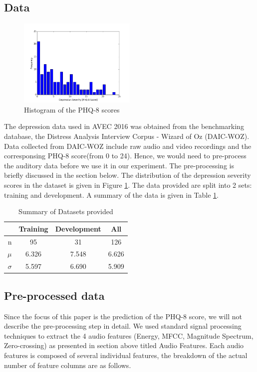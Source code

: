 \documentclass{article}
\begin{document}
	\subsection{Data}
	\begin{figure}[h]
	\center
 	\includegraphics[width=0.5\textwidth]{histogram_phq8}
	\caption{Histogram of the PHQ-8 scores}
	\label{histogram_phq8}
	\end{figure}
	
	The depression data used in AVEC 2016 was obtained from the benchmarking database, the Distress Analysis Interview Corpus - Wizard of Oz (DAIC-WOZ). 
	Data collected from DAIC-WOZ include raw audio and video recordings and the corresponsing PHQ-8 score(from 0 to 24)\cite{jad2008}. Hence, we would 
	need to pre-process the auditory data before we use it in our experiment. The pre-processing is briefly discussed in the section below.
	The distribution of the depression severity scores in the dataset is given in Figure \ref{histogram_phq8}. The data provided are split into 2 sets: training and development.
	A summary of the data is given in Table \ref{summary_table}.

 	\begin{table}[h]
 		\begin{center}
  			\begin{tabular}{ | r | c | c || c | }
    			\hline
			 & Training & Development & All \\ \hline\hline
			 n               & 95 & 31 & 126 \\ \hline
			 $\mu$           & 6.326 & 7.548 & 6.626 \\ \hline
			 $\sigma$        & 5.597 & 6.690 & 5.909 \\ \hline
			 \end{tabular}
		\end{center}
 	\caption{Summary of Datasets provided}
 	\label{summary_table}
 	\end{table}

    \subsection{Pre-processed data}
	Since the focus of this paper is the prediction of the PHQ-8 score, we will not describe the pre-processing step in detail.
	We used standard signal processing techniques to extract the 4 audio features (Energy, MFCC, Magnitude Spectrum, Zero-crossing) as presented in section above titled Audio Features.
	Each audio features is composed of several individual features, the breakdown of the actual number of feature columns are as follows.
\end{document}
